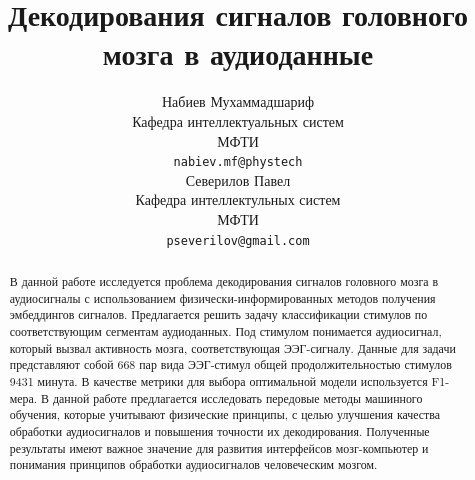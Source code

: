 \documentclass{article}
\title{Декодирования сигналов головного мозга в аудиоданные}
\author{ Набиев Мухаммадшариф \\
        Кафедра интеллектуальных систем\\
	МФТИ\\
	\texttt{nabiev.mf@phystech} \\
	\And
	Северилов Павел \\
	Кафедра интеллектульных систем\\
	МФТИ\\
	\texttt{pseverilov@gmail.com} \\
}
\date{}
\begin{document}
\maketitle

\begin{abstract}
  В данной работе исследуется проблема декодирования сигналов головного мозга в аудиосигналы с использованием физически-информированных методов получения эмбеддингов сигналов. Предлагается решить задачу классификации стимулов по соответствующим сегментам аудиоданных. Под стимулом понимается аудиосигнал, который вызвал активность мозга, соответствующая ЭЭГ-сигналу. Данные для задачи представляют собой 668 пар вида ЭЭГ-стимул общей продолжительностью стимулов 9431 минута. В качестве метрики для выбора оптимальной модели используется F1-мера. В данной работе предлагается исследовать передовые методы машинного обучения, которые учитывают физические принципы, с целью улучшения качества обработки аудиосигналов и повышения точности их декодирования. Полученные результаты имеют важное значение для развития интерфейсов мозг-компьютер и понимания принципов обработки аудиосигналов человеческим мозгом.

\end{abstract}


\end{document}
